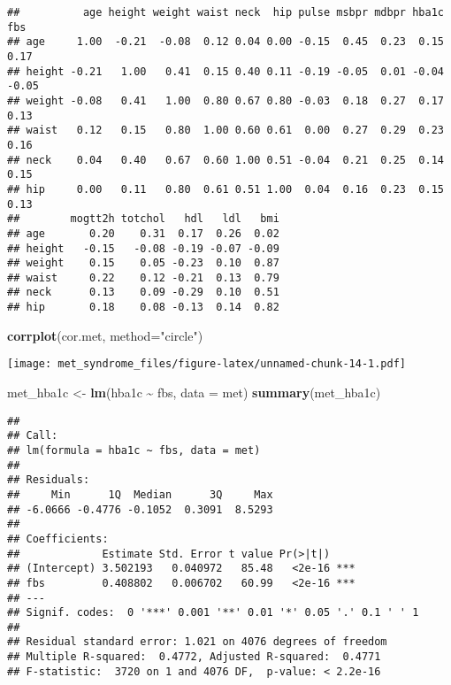 \documentclass[
]{article}
\newenvironment{Shaded}{\begin{snugshade}}{\end{snugshade}}
\newcommand{\AttributeTok}[1]{\textcolor[rgb]{0.13,0.29,0.53}{#1}}
\newcommand{\FunctionTok}[1]{\textcolor[rgb]{0.13,0.29,0.53}{\textbf{#1}}}
\newcommand{\NormalTok}[1]{#1}
\newcommand{\OtherTok}[1]{\textcolor[rgb]{0.56,0.35,0.01}{#1}}
\newcommand{\SpecialCharTok}[1]{\textcolor[rgb]{0.81,0.36,0.00}{\textbf{#1}}}
\newcommand{\StringTok}[1]{\textcolor[rgb]{0.31,0.60,0.02}{#1}}
\begin{document}
\begin{verbatim}
##          age height weight waist neck  hip pulse msbpr mdbpr hba1c   fbs
## age     1.00  -0.21  -0.08  0.12 0.04 0.00 -0.15  0.45  0.23  0.15  0.17
## height -0.21   1.00   0.41  0.15 0.40 0.11 -0.19 -0.05  0.01 -0.04 -0.05
## weight -0.08   0.41   1.00  0.80 0.67 0.80 -0.03  0.18  0.27  0.17  0.13
## waist   0.12   0.15   0.80  1.00 0.60 0.61  0.00  0.27  0.29  0.23  0.16
## neck    0.04   0.40   0.67  0.60 1.00 0.51 -0.04  0.21  0.25  0.14  0.15
## hip     0.00   0.11   0.80  0.61 0.51 1.00  0.04  0.16  0.23  0.15  0.13
##        mogtt2h totchol   hdl   ldl   bmi
## age       0.20    0.31  0.17  0.26  0.02
## height   -0.15   -0.08 -0.19 -0.07 -0.09
## weight    0.15    0.05 -0.23  0.10  0.87
## waist     0.22    0.12 -0.21  0.13  0.79
## neck      0.13    0.09 -0.29  0.10  0.51
## hip       0.18    0.08 -0.13  0.14  0.82
\end{verbatim}

\begin{Shaded}
\begin{Highlighting}[]
\FunctionTok{corrplot}\NormalTok{(cor.met, }\AttributeTok{method=}\StringTok{"circle"}\NormalTok{)}
\end{Highlighting}
\end{Shaded}

\texttt{[image: met\_syndrome\_files/figure-latex/unnamed-chunk-14-1.pdf]}

\begin{Shaded}
\begin{Highlighting}[]
\NormalTok{met\_hba1c }\OtherTok{\textless{}{-}} \FunctionTok{lm}\NormalTok{(hba1c }\SpecialCharTok{\textasciitilde{}}\NormalTok{ fbs, }\AttributeTok{data =}\NormalTok{ met)}
\FunctionTok{summary}\NormalTok{(met\_hba1c)}
\end{Highlighting}
\end{Shaded}

\begin{verbatim}
## 
## Call:
## lm(formula = hba1c ~ fbs, data = met)
## 
## Residuals:
##     Min      1Q  Median      3Q     Max 
## -6.0666 -0.4776 -0.1052  0.3091  8.5293 
## 
## Coefficients:
##             Estimate Std. Error t value Pr(>|t|)    
## (Intercept) 3.502193   0.040972   85.48   <2e-16 ***
## fbs         0.408802   0.006702   60.99   <2e-16 ***
## ---
## Signif. codes:  0 '***' 0.001 '**' 0.01 '*' 0.05 '.' 0.1 ' ' 1
## 
## Residual standard error: 1.021 on 4076 degrees of freedom
## Multiple R-squared:  0.4772, Adjusted R-squared:  0.4771 
## F-statistic:  3720 on 1 and 4076 DF,  p-value: < 2.2e-16
\end{verbatim}
\end{document}
